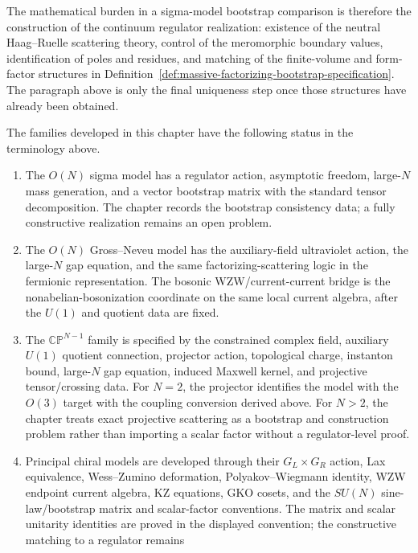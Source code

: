 The mathematical burden in a sigma-model bootstrap comparison is therefore
the construction of the continuum regulator realization: existence of the
neutral Haag--Ruelle scattering theory, control of the meromorphic boundary
values, identification of poles and residues, and matching of the finite-volume
and form-factor structures in
Definition~\ref{def:massive-factorizing-bootstrap-specification}.
The paragraph above is only the final uniqueness step once those structures have
already been obtained.

\begin{definition}
\label{def:sigma-model-family-status-summary}
The families developed in this chapter have the following status in the
terminology above.
\begin{enumerate}
  \item The \(O(N)\) sigma model has a regulator action, asymptotic freedom,
  large-\(N\) mass generation, and a vector bootstrap matrix with the standard
  tensor decomposition.  The chapter records the bootstrap consistency data;
  a fully constructive realization remains an open problem.
  \item The \(O(N)\) Gross--Neveu model has the auxiliary-field ultraviolet
  action, the large-\(N\) gap equation, and the same factorizing-scattering
  logic in the fermionic representation.  The bosonic WZW/current-current
  bridge is the nonabelian-bosonization coordinate on the same local current
  algebra, after the \(U(1)\) and quotient data are fixed.
  \item The \(\mathbb{CP}^{N-1}\) family is specified by the constrained
  complex field, auxiliary \(U(1)\) quotient connection, projector action,
  topological charge, instanton bound, large-\(N\) gap equation, induced
  Maxwell kernel, and projective tensor/crossing data.  For
  \(N=2\), the projector identifies the model with the \(O(3)\) target with
  the coupling conversion derived above.  For \(N>2\), the chapter treats
  exact projective scattering as a bootstrap and construction problem rather
  than importing a scalar factor without a regulator-level proof.
  \item Principal chiral models are developed through their
  \(G_L\times G_R\) action, Lax equivalence, Wess--Zumino deformation,
  Polyakov--Wiegmann identity, WZW endpoint current algebra, KZ equations,
  GKO cosets, and the \(SU(N)\) sine-law/bootstrap matrix and scalar-factor
  conventions.  The matrix and scalar unitarity identities are proved in the
  displayed convention; the constructive matching to a regulator remains

\end{enumerate}
\end{definition}
